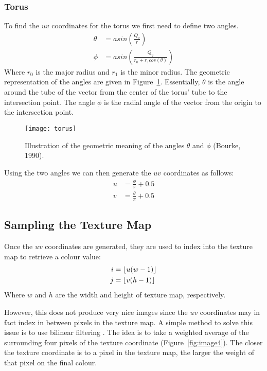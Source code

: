 \subsubsection*{Torus}
To find the $uv$ coordinates for the torus we first need to define two angles.
\begin{equation}
\begin{split}
  \theta &= asin(\frac{Q_{z}}{r}) \\
  \phi &= asin(\frac{Q_{y}}{r_{0} + r_{1}cos(\theta)})
\end{split}
\end{equation}
Where $r_{0}$ is the major radius and $r_{1}$ is the minor radius. The geometric
representation of the angles are given in Figure~\ref{fig:image3}. Essentially,
$\theta$ is the angle around the tube of the vector from the center of the 
torus' tube to the intersection point. The angle $\phi$ is the radial angle of
the vector from the origin to the intersection point.

\begin{figure}[ht]
  \texttt{[image: torus]}
  \caption{Illustration of the geometric meaning of the angles $\theta$ and 
  $\phi$ (Bourke, 1990).}
  \label{fig:image3}
\end{figure}

Using the two angles we can then generate the $uv$ coordinates as follows:
\begin{equation}
\begin{split}
  u &= \frac{\phi}{\pi} + 0.5 \\
  v &= \frac{\theta}{\pi} + 0.5
\end{split}
\end{equation}

\subsection{Sampling the Texture Map}
Once the $uv$ coordinates are generated, they are used to index into the texture
map to retrieve a colour value:
\begin{equation}
\begin{split}
  i &= \floor*{u(w - 1)} \\
  j &= \floor*{v(h - 1)}
\end{split}
\end{equation}
Where $w$ and $h$ are the width and height of texture map, respectively.

However, this does not produce very nice images since the $uv$ coordinates may
in fact index in between pixels in the texture map. A simple method to solve
this issue is to use bilinear filtering \cite{BlinnNewell-1976}. The idea is to
take a weighted average of the surrounding four pixels of the texture coordinate
(Figure~\ref{fig:image4}). The closer the texture coordinate is to a pixel in
the texture map, the larger the weight of that pixel on the final colour.

